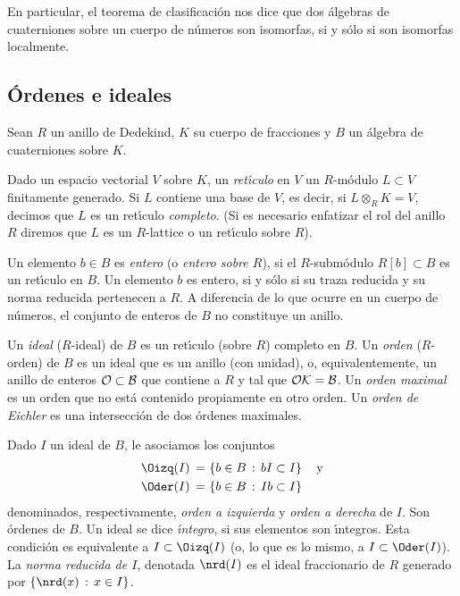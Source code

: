 En particular, el teorema de clasificaci\'{o}n nos dice que dos \'{a}lgebras
de cuaterniones sobre un cuerpo de n\'{u}meros son isomorfas, si y s\'{o}lo
si son isomorfas localmente.

\subsection{\'{O}rdenes e ideales}
Sean $R$ un anillo de Dedekind, $K$ su cuerpo de fracciones y $B$ un
\'{a}lgebra de cuaterniones sobre $K$.

Dado un espacio vectorial $V$ sobre $K$, un \emph{ret\'{\i}culo} en $V$
un $R$-m\'{o}dulo $L\subset V$ finitamente generado. Si $L$ contiene una
base de $V$, es decir, si $L\otimes_{R}K=V$, decimos que $L$ es un
ret\'{\i}culo \emph{completo}. (Si es necesario enfatizar el rol del anillo
$R$ diremos que $L$ es un $R$-lattice o un ret\'{\i}culo sobre $R$).

Un elemento $b\in B$ es \emph{entero} (o \emph{entero sobre $R$}),
si el $R$-subm\'{o}dulo $R[b]\subset B$ es un ret\'{\i}culo en $B$.
Un elemento $b$ es entero, si y s\'{o}lo si su traza reducida y su norma
reducida pertenecen a $R$. A diferencia de lo que ocurre en un cuerpo de
n\'{u}meros, el conjunto de enteros de $B$ no constituye un anillo.

Un \emph{ideal} ($R$-ideal) de $B$ es un ret\'{\i}culo (sobre $R$) completo
en $B$. Un \emph{orden} ($R$-orden) de $B$ es un ideal que es un anillo
(con unidad), o, equivalentemente, un anillo de enteros $\cal{O}\subset B$
que contiene a $R$ y tal que $\cal{O}K=B$. Un \emph{orden maximal} es un
orden que no est\'{a} contenido propiamente en otro orden. Un
\emph{orden de Eichler} es una intersecci\'{o}n de dos \'{o}rdenes maximales.

Dado $I$ un ideal de $B$, le asociamos los conjuntos
\begin{align*}
	\Oizq(I) \,=\, & \left\lbrace b\in B\,:\,bI\subset I\right\rbrace
	\quad\text{y}\\
	\Oder(I) \,=\, & \left\lbrace b\in B\,:\,Ib\subset I\right\rbrace
\end{align*}
%
denominados, respectivamente, \emph{orden a izquierda} y \emph{orden a derecha}
de $I$. Son \'{o}rdenes de $B$. Un ideal se dice \emph{\'{\i}ntegro}, si sus
elementos son \'{\i}ntegros. Esta condici\'{o}n es equivalente a
$I\subset\Oizq(I)$ (o, lo que es lo mismo, a $I\subset\Oder(I)$).
La \emph{norma reducida de $I$}, denotada $\nrd(I)$ es el ideal fraccionario
de $R$ generado por $\{\nrd(x)\,:\,x\in I\}$.

